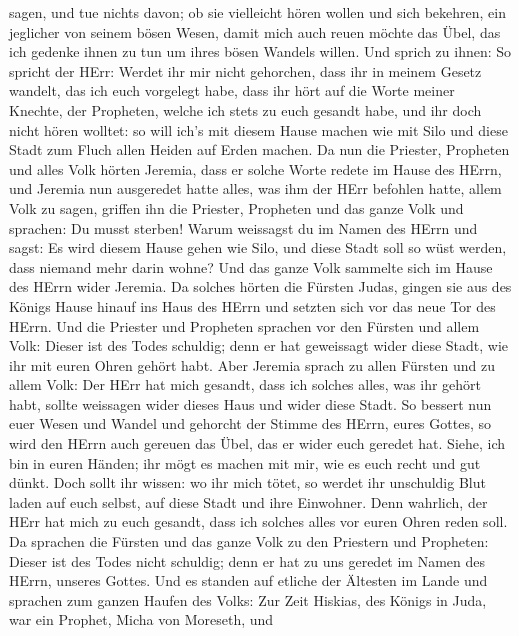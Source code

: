 sagen, und tue nichts davon;  ob sie vielleicht hören wollen
und sich bekehren, ein jeglicher von seinem bösen Wesen, damit mich auch
reuen möchte das Übel, das ich gedenke ihnen zu tun um ihres bösen
Wandels willen.  Und sprich zu ihnen: So spricht der HErr:
Werdet ihr mir nicht gehorchen, dass ihr in meinem Gesetz wandelt, das
ich euch vorgelegt habe,  dass ihr hört auf die Worte meiner
Knechte, der Propheten, welche ich stets zu euch gesandt habe, und ihr
doch nicht hören wolltet:  so will ich's mit diesem Hause
machen wie mit Silo und diese Stadt zum Fluch allen Heiden auf Erden
machen.  Da nun die Priester, Propheten und alles Volk
hörten Jeremia, dass er solche Worte redete im Hause des HErrn,
 und Jeremia nun ausgeredet hatte alles, was ihm der HErr
befohlen hatte, allem Volk zu sagen, griffen ihn die Priester, Propheten
und das ganze Volk und sprachen: Du musst sterben!  Warum
weissagst du im Namen des HErrn und sagst: Es wird diesem Hause gehen
wie Silo, und diese Stadt soll so wüst werden, dass niemand mehr darin
wohne? Und das ganze Volk sammelte sich im Hause des HErrn wider
Jeremia.  Da solches hörten die Fürsten Judas, gingen sie
aus des Königs Hause hinauf ins Haus des HErrn und setzten sich vor das
neue Tor des HErrn.  Und die Priester und Propheten
sprachen vor den Fürsten und allem Volk: Dieser ist des Todes schuldig;
denn er hat geweissagt wider diese Stadt, wie ihr mit euren Ohren gehört
habt.  Aber Jeremia sprach zu allen Fürsten und zu allem
Volk: Der HErr hat mich gesandt, dass ich solches alles, was ihr gehört
habt, sollte weissagen wider dieses Haus und wider diese Stadt.
 So bessert nun euer Wesen und Wandel und gehorcht der
Stimme des HErrn, eures Gottes, so wird den HErrn auch gereuen das Übel,
das er wider euch geredet hat.  Siehe, ich bin in euren
Händen; ihr mögt es machen mit mir, wie es euch recht und gut dünkt.
 Doch sollt ihr wissen: wo ihr mich tötet, so werdet ihr
unschuldig Blut laden auf euch selbst, auf diese Stadt und ihre
Einwohner. Denn wahrlich, der HErr hat mich zu euch gesandt, dass ich
solches alles vor euren Ohren reden soll.  Da sprachen die
Fürsten und das ganze Volk zu den Priestern und Propheten: Dieser ist
des Todes nicht schuldig; denn er hat zu uns geredet im Namen des HErrn,
unseres Gottes.  Und es standen auf etliche der Ältesten im
Lande und sprachen zum ganzen Haufen des Volks:  Zur Zeit
Hiskias, des Königs in Juda, war ein Prophet, Micha von Moreseth, und
